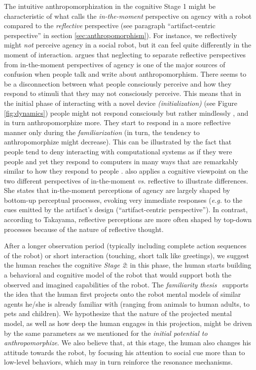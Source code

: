 \documentclass{frontiersSCNS} %
\newcommand{\eg}{\textit{e.g.}\xspace}
\newcommand{\vs}{\textit{vs.}\xspace}
\begin{document}
The intuitive anthropomorphization in the cognitive Stage 1 might be
characteristic of what \cite{takayama_perspectives_2012} calls the
\textit{in-the-moment} perspective on agency with a robot compared to the
\textit{reflective} perspective (see paragraph ``artifact-centric perspective''
in section \ref{sec:anthropomorphism}).  For instance, we reflectively might
\textit{not} perceive agency in a social robot, but it can feel quite
differently in the moment of interaction. \cite{takayama_perspectives_2012}
argues that neglecting to separate reflective perspectives from in-the-moment
perspectives of agency is one of the major sources of confusion when people talk
and write about anthropomorphism. There seems to be a disconnection between what
people consciously perceive and how they respond to stimuli that they may not
consciously perceive. This means that in the initial phase of interacting with a
novel device \textit{(initialization)} (see Figure \ref{fig:dynamics}) people
might not respond consciously but rather mindlessly \citep{nass_machines_2000},
and in turn anthropomorphize more. They start to respond in a more reflective
manner only during the \textit{familiarization} (in turn, the tendency to
anthropomorphize might decrease). This can be illustrated by the fact that
people tend to deny interacting with computational systems as if they were
people and yet they respond to computers in many ways that are remarkably
similar to how they respond to people \citep{reeves_media_1996}.
\cite{takayama_perspectives_2012} also applies a cognitive viewpoint on the two
different perspectives of in-the-moment \vs reflective to illustrate
differences. She states that in-the-moment perceptions of agency are largely
shaped by bottom-up perceptual processes, evoking very immediate responses (\eg
to the cues emitted by the artifact's design (``artifact-centric
perspective''). In contrast, according to Takayama, reflective perceptions are
more often shaped by top-down processes because of the nature of reflective
thought.

After a longer observation period (typically including complete action sequences
of the robot) or short interaction (touching, short talk like greetings), we
suggest the human reaches the cognitive \emph{Stage 2}: in this phase, the human
starts building a behavioral and cognitive model of the robot that would support
both the observed and imagined capabilities of the robot.  The \emph{familiarity
thesis}~\citep{hegel_understanding_2008} supports the idea that the human first
projects onto the robot mental models of similar agents he/she is already
familiar with (ranging from animals to human adults, to pets and children). We
hypothesize that the nature of the projected mental model, as well as how deep
the human engages in this projection, might be driven by the same parameters as
we mentioned for the \emph{initial potential to anthropomorphize}. We also believe
that, at this stage, the human also changes his attitude towards the robot, by
focusing his attention to social cue more than to low-level behaviors, which
may in turn reinforce the resonance mechanisms.
\end{document}
